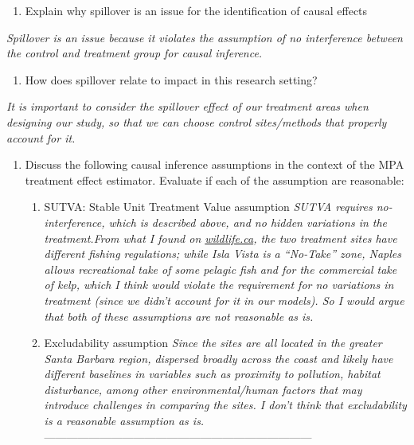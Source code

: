 \documentclass[
]{article}
\providecommand{\tightlist}{%
  \setlength{\itemsep}{0pt}\setlength{\parskip}{0pt}}
\begin{document}
\begin{enumerate}
\def\labelenumi{\alph{enumi}.}
\setcounter{enumi}{1}
\tightlist
\item
  Explain why spillover is an issue for the identification of causal
  effects
\end{enumerate}

\emph{Spillover is an issue because it violates the assumption of no
interference between the control and treatment group for causal
inference.}

\begin{enumerate}
\def\labelenumi{\alph{enumi}.}
\setcounter{enumi}{2}
\tightlist
\item
  How does spillover relate to impact in this research setting?
\end{enumerate}

\emph{It is important to consider the spillover effect of our treatment
areas when designing our study, so that we can choose control
sites/methods that properly account for it.}

\begin{enumerate}
\def\labelenumi{\alph{enumi}.}
\setcounter{enumi}{3}
\item
  Discuss the following causal inference assumptions in the context of
  the MPA treatment effect estimator. Evaluate if each of the assumption
  are reasonable:

  \begin{enumerate}
  \def\labelenumii{\arabic{enumii})}
  \item
    SUTVA: Stable Unit Treatment Value assumption \emph{SUTVA requires
    no-interference, which is described above, and no hidden variations
    in the treatment.From what I found on
    \href{https://wildlife.ca.gov/Conservation/Marine/MPAs/Naples}{wildlife.ca},
    the two treatment sites have different fishing regulations; while
    Isla Vista is a ``No-Take'' zone, Naples allows recreational take of
    some pelagic fish and for the commercial take of kelp, which I think
    would violate the requirement for no variations in treatment (since
    we didn't account for it in our models). So I would argue that both
    of these assumptions are not reasonable as is.}
  \item
    Excludability assumption \emph{Since the sites are all located in
    the greater Santa Barbara region, dispersed broadly across the coast
    and likely have different baselines in variables such as proximity
    to pollution, habitat disturbance, among other environmental/human
    factors that may introduce challenges in comparing the sites. I
    don't think that excludability is a reasonable assumption as is.}
    ------------------------------------------------------------------------
  \end{enumerate}
\end{enumerate}
\end{document}
